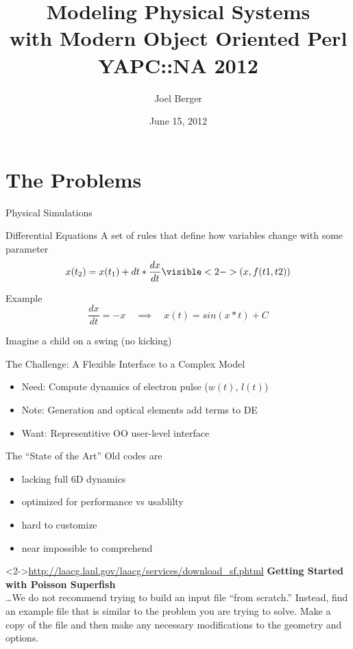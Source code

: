 \documentclass[mathserif]{beamer}
\title[OO Physical Modeling]{Modeling Physical Systems\\with Modern Object Oriented Perl\\YAPC::NA 2012}
\author{Joel Berger}
\institute[UIC]{University of Illinois at Chicago}
\date{June 15, 2012}
\begin{document}
\begin{frame}
  \maketitle
\end{frame}

\section{The Problems}

\begin{frame}{Physical Simulations}
  \begin{block}{Differential Equations}
    A set of rules that define how variables change with some parameter
    \begin{equation*}
      x(t_2) = x(t_1) + dt*\frac{dx}{dt}\visible<2->{(x,f(t1,t2))}
    \end{equation*}
  \end{block}
  \begin{block}{Example}
    \begin{equation*}
      \frac{dx}{dt} = -x \quad\implies\quad x(t) = sin(x*t) + C
    \end{equation*}
  \end{block}
  Imagine a child on a swing (no kicking)
\end{frame}

\begin{frame}{The Challenge: A Flexible Interface to a Complex Model}
  
  \begin{itemize}
    \item<2-> Need: Compute dynamics of electron pulse ($w(t)$, $l(t)$)
    \item<3-> Note: Generation and optical elements add terms to DE
    \item<4-> Want: Representitive OO user-level interface
  \end{itemize}
\end{frame}

\begin{frame}{The ``State of the Art''}
  Old codes are
  \begin{itemize}
    \item lacking full 6D dynamics
    \item optimized for performance vs usablilty
    \item hard to customize
    \item near impossible to comprehend
  \end{itemize}
  \begin{block}<2->{\url{http://laacg.lanl.gov/laacg/services/download_sf.phtml}}
    \textbf{Getting Started with Poisson Superfish}\\
    \ldots We do not recommend trying to build an input file ``from scratch.'' Instead, find an example file that is similar to the problem you are trying to solve. Make a copy of the file and then make any necessary modifications to the geometry and options.
  \end{block}
\end{frame}
\end{document}
